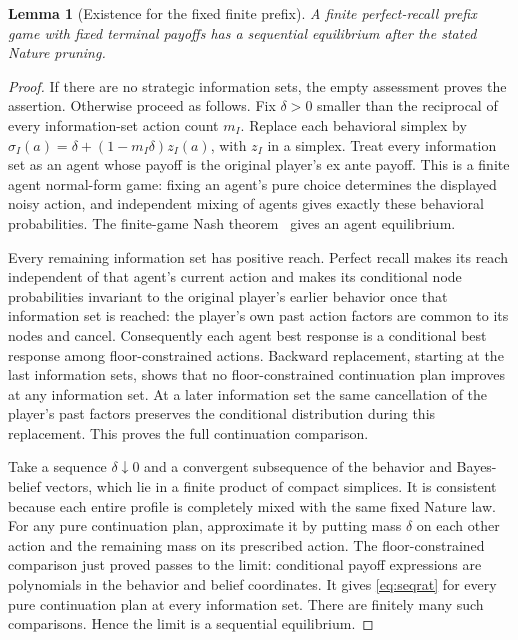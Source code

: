 \documentclass[11pt,a4paper]{article}
\numberwithin{equation}{section}
\newtheorem{lemma}[theorem]{Lemma}
\theoremstyle{definition}
\begin{document}
\begin{lemma}[Existence for the fixed finite prefix]\label{lem:se}
A finite perfect-recall prefix game with fixed terminal payoffs has a
sequential equilibrium after the stated Nature pruning.
\end{lemma}
\begin{proof}
If there are no strategic information sets, the empty assessment proves
the assertion. Otherwise proceed as follows.
Fix \(\delta>0\) smaller than the reciprocal of every information-set
action count \(m_I\). Replace each behavioral simplex by
\(\sigma_I(a)=\delta+(1-m_I\delta)z_I(a)\), with \(z_I\) in a simplex.
Treat every information set as an agent whose payoff is the original
player's ex ante payoff. This is a finite agent normal-form game: fixing
an agent's pure choice determines the displayed noisy action, and
independent mixing of agents gives exactly these behavioral probabilities.
The finite-game Nash theorem~\cite[Theorem~1]{nash} gives an agent
equilibrium.

Every remaining information set has positive reach. Perfect recall makes
its reach independent of that agent's current action and makes its
conditional node probabilities invariant to the original player's earlier
behavior once that information set is reached: the player's own past
action factors are common to its nodes and cancel. Consequently each
agent best response is a conditional best response among floor-constrained
actions. Backward replacement, starting at the last information sets,
shows that no floor-constrained continuation plan improves at any
information set. At a later information set the same cancellation of the
player's past factors preserves the conditional distribution during this
replacement. This proves the full continuation comparison.

Take a sequence \(\delta\downarrow0\) and a convergent subsequence of the
behavior and Bayes-belief vectors, which lie in a finite product of compact
simplices. It is consistent because each entire profile is completely
mixed with the same fixed Nature law. For any pure continuation plan,
approximate it by putting mass \(\delta\) on each other action and the
remaining mass on its prescribed action. The floor-constrained comparison
just proved passes to the limit: conditional payoff expressions are
polynomials in the behavior and belief coordinates. It gives
\eqref{eq:seqrat} for every pure continuation plan at every information
set. There are finitely many such comparisons. Hence the limit is a
sequential equilibrium.
\end{proof}
\end{document}
